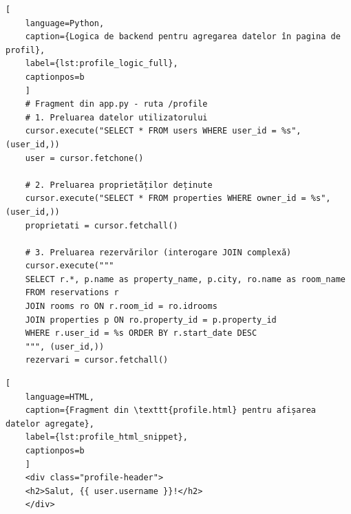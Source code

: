 \documentclass[12pt, a4paper, oneside, romanian]{teza-upb}
\begin{document}
\begin{lstlisting}[
	language=Python,
	caption={Logica de backend pentru agregarea datelor în pagina de profil},
	label={lst:profile_logic_full},
	captionpos=b
	]
	# Fragment din app.py - ruta /profile
	# 1. Preluarea datelor utilizatorului
	cursor.execute("SELECT * FROM users WHERE user_id = %s", (user_id,))
	user = cursor.fetchone()
	
	# 2. Preluarea proprietăților deținute
	cursor.execute("SELECT * FROM properties WHERE owner_id = %s", (user_id,))
	proprietati = cursor.fetchall()
	
	# 3. Preluarea rezervărilor (interogare JOIN complexă)
	cursor.execute("""
	SELECT r.*, p.name as property_name, p.city, ro.name as room_name
	FROM reservations r
	JOIN rooms ro ON r.room_id = ro.idrooms
	JOIN properties p ON ro.property_id = p.property_id
	WHERE r.user_id = %s ORDER BY r.start_date DESC
	""", (user_id,))
	rezervari = cursor.fetchall()
\end{lstlisting}

\begin{lstlisting}[
	language=HTML,
	caption={Fragment din \texttt{profile.html} pentru afișarea datelor agregate},
	label={lst:profile_html_snippet},
	captionpos=b
	]
	<div class="profile-header">
	<h2>Salut, {{ user.username }}!</h2>
	</div>
\end{lstlisting}
\end{document}
